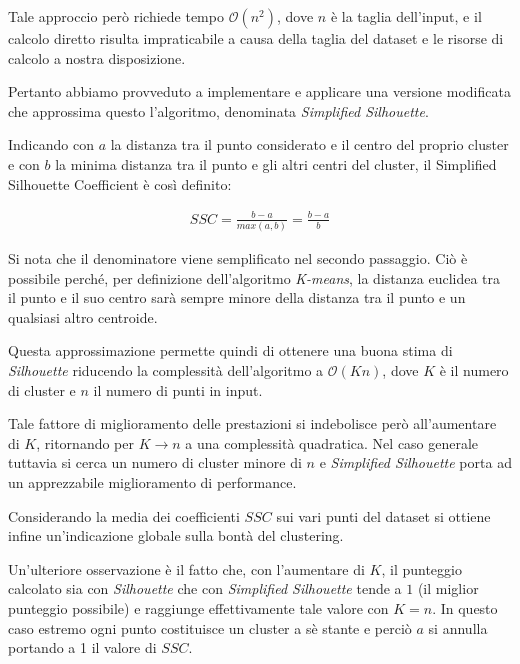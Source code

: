 \documentclass[
	11pt, %
	a4paper, %
	oneside, %
	headinclude,footinclude, %
	BCOR5mm, %
]{scrartcl}
\begin{document}
			Tale approccio però richiede tempo $\mathcal{O}(n^2)$, dove $n$ è la taglia dell'input, e il calcolo diretto risulta impraticabile a causa della taglia del dataset e le risorse di calcolo a nostra disposizione.

			Pertanto abbiamo provveduto a implementare e applicare una versione modificata che approssima questo l'algoritmo, denominata \emph{Simplified Silhouette}\cite{sscmapreduce}.
			
			Indicando con $a$ la distanza tra il punto considerato e il centro del proprio cluster e con $b$ la minima distanza tra il punto e gli altri centri del cluster, il {Simplified Silhouette Coefficient} è così definito:

			\begin{equation} \begin{aligned} \label{eq:simplifiedSilhouette}
				SSC = \frac{b - a}{ max(a, b) } = \frac{b - a}{b}
			\end{aligned} \end{equation}

			Si nota che il denominatore viene semplificato nel secondo passaggio.
			Ciò è possibile perché, per definizione dell'algoritmo \emph{K-means}, la distanza euclidea tra il punto e il suo centro sarà sempre minore della distanza tra il punto e un qualsiasi altro centroide.
			

			Questa approssimazione permette quindi di ottenere una buona stima di \emph{Silhouette}\cite{ssc} riducendo la complessità dell'algoritmo a $\mathcal{O}(Kn)$, dove $K$ è il numero di cluster e $n$ il numero di punti in input.
			
			Tale fattore di miglioramento delle prestazioni si indebolisce però all'aumentare di $K$, ritornando per $K \to n$ a una complessità quadratica. 
			Nel caso generale tuttavia si cerca un numero di cluster minore di $n$ e \emph{Simplified Silhouette} porta ad un apprezzabile miglioramento di performance.

			Considerando la media dei coefficienti $SSC$ sui vari punti del dataset si ottiene infine un'indicazione globale sulla bontà del clustering.

			\smallbreak
			Un'ulteriore osservazione è il fatto che, con l'aumentare di $K$, il punteggio calcolato sia con \emph{Silhouette} che con \emph{Simplified Silhouette} tende a $1$ (il miglior punteggio possibile) e raggiunge effettivamente tale valore con $K = n$.
			In questo caso estremo ogni punto costituisce un cluster a sè stante e perciò $a$ si annulla portando a 1 il valore di $SSC$.
			
\end{document}
